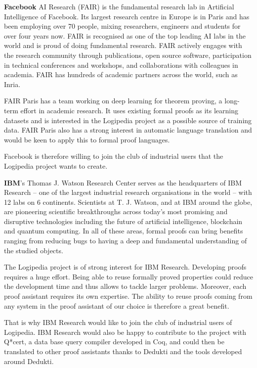 {{\bf Facebook} AI Research (FAIR) is the fundamental research lab in
Artificial Intelligence of Facebook. Its largest research centre in
Europe is in Paris and has been employing over 70 people, mixing
researchers, engineers and students for over four years now. FAIR is
recognised as one of the top leading AI labs in the world and is proud
of doing fundamental research. FAIR actively engages with the research
community through publications, open source software, participation in
technical conferences and workshops, and collaborations with
colleagues in academia. FAIR has hundreds of academic partners across
the world, such as Inria.

FAIR Paris has a team working on deep learning for theorem proving, a
long-term effort in academic research. It uses existing formal proofs
as its learning datasets and is interested in the Logipedia project as
a possible source of training data. FAIR Paris also has a strong
interest in automatic language translation and would be keen to apply
this to formal proof languages.

Facebook is therefore willing to join the club of industrial users
that the Logipedia project wants to create.

{\bf IBM}'s Thomas J. Watson Research Center serves as the
headquarters of IBM Research -- one of the largest industrial research
organisations in the world -- with 12 labs on 6 continents. Scientists
at T. J. Watson, and at IBM around the globe, are pioneering
scientific breakthroughs across today's most promising and disruptive
technologies including the future of artificial intelligence, blockchain
and quantum computing. In all of these areas, formal proofs can bring
benefits ranging from reducing bugs to having a deep and fundamental
understanding of the studied objects.

The Logipedia project is of strong interest for IBM
Research. Developing proofs requires a huge effort. Being able to
reuse formally proved properties could reduce the development time and
thus allows to tackle larger problems. Moreover, each proof assistant
requires its own expertise. The ability to reuse proofs coming from
any system in the proof assistant of our choice is therefore a great
benefit.

That is why IBM Research would like to join the club of industrial
users of Logipedia. IBM Research would also be happy to contribute to
the project with Q*cert, a data base query compiler developed in Coq,
and could then be translated to other proof assistants thanks to
Dedukti and the tools developed around Dedukti.

}

